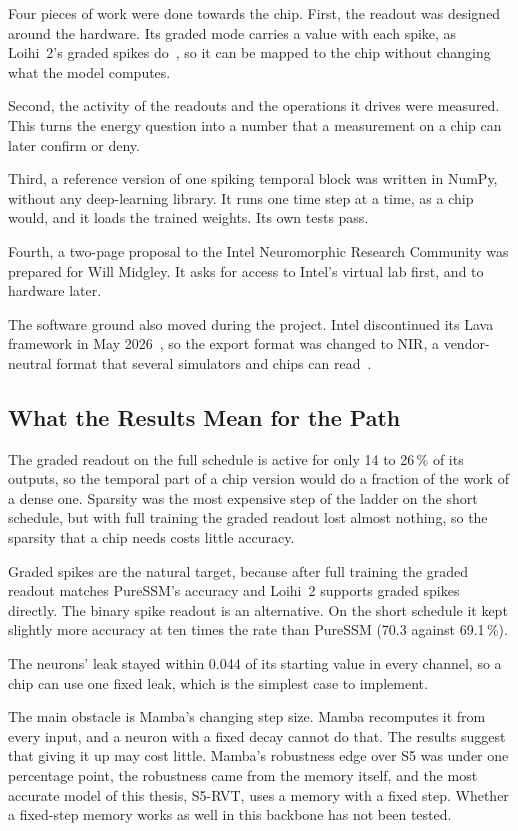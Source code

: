 \documentclass[11pt, a4paper]{report}
\begin{document}
Four pieces of work were done towards the chip. First, the readout was designed around the hardware. Its graded mode
carries a value with each spike, as Loihi~2's graded spikes do~\cite{orchard2021efficient}, so it can be
mapped to the chip without changing what the model computes.

Second, the activity of the readouts and the operations it drives were measured. This turns the energy
question into a number that a measurement on a chip can later confirm or deny.

Third, a reference version of one spiking temporal block was written in NumPy, without any deep-learning
library. It runs one time step at a time, as a chip would, and it loads the trained weights. Its own tests
pass.

Fourth, a two-page proposal to the Intel Neuromorphic Research Community was prepared for Will Midgley.
It asks for access to Intel's virtual lab first, and to hardware later.

The software ground also moved during the project. Intel discontinued its Lava framework in May
2026~\cite{intel2026lava}, so the export format was changed to NIR, a vendor-neutral format that several
simulators and chips can read~\cite{pedersen2024neuromorphic}. 

\newpage
\subsection{What the Results Mean for the Path}

The graded readout on the full schedule is active for only
14 to 26\,\% of its outputs, so the temporal part of a chip version would do a fraction of the work of a
dense one. Sparsity was the most expensive step of the ladder on the short schedule, but with full training the graded readout lost almost nothing, so the sparsity that a chip needs costs little accuracy.

Graded spikes are the natural target, because after full training the graded readout matches PureSSM's accuracy and Loihi~2 supports graded spikes directly. The binary spike readout is an alternative. On the short schedule it kept slightly more accuracy at ten times the rate than PureSSM (70.3 against 69.1\,\%).

The neurons' leak stayed within 0.044 of its starting value in every channel, so a chip can use one fixed leak, which is the simplest case to implement.

The main obstacle is Mamba's changing step size. Mamba recomputes it from every input, and a neuron with a fixed decay cannot do that. The results suggest that giving it up may cost little. Mamba's robustness edge over S5 was under one percentage point, the robustness came from
the memory itself, and the most accurate model of this thesis, S5-RVT, uses a memory with a fixed step.
Whether a fixed-step memory works as well in this backbone has not been tested.
\end{document}
